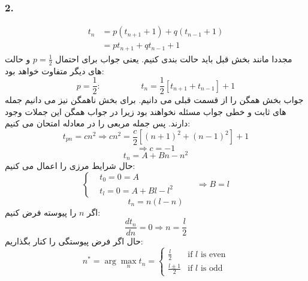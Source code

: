 \documentclass[]{article}
\begin{document}
	\subsubsection{2.}
	\begin{equation}
		\nonumber
		\begin{split}
			t_n &= p (t_{n+1} + 1) + q (t_{n-1}+1)\\
			&=pt_{n+1} + qt_{n-1} + 1
		\end{split}
	\end{equation}
	مجددا مانند بخش قبل باید حالت بندی کنیم. یعنی جواب برای احتمال $p=\frac{1}{2}$ و حالت های دیگر متفاوت خواهد بود:
	\begin{equation}
		\nonumber
		p = \frac{1}{2}: \hspace{2cm} t_n = \frac{1}{2} [t_{n+1}+t_{n-1}] + 1
	\end{equation}
	جواب بخش همگن را از قسمت قبلی می دانیم. برای بخش ناهمگن نیز می دانیم جمله های ثابت و خطی جواب مسئله نخواهند بود زیرا در جواب همگن این جملات وجود دارند. پس جمله مربعی را در معادله امتحان می کنیم:
	\begin{equation}
		\nonumber
		t_{pn} = cn^2 \Rightarrow cn^2 = \frac{c}{2} [(n+1)^2 + (n-1)^2] + 1
	\end{equation}
	\begin{equation}
		\nonumber
		\Rightarrow c = -1
	\end{equation}
	\begin{equation}
		\nonumber
		t_{n} = A+Bn -n^2 
	\end{equation}
	حال شرایط مرزی را اعمال می کنیم:
	\begin{equation}
		\nonumber
		\begin{cases}
			&t_0 = 0 = A\\
			&t_l = 0 = A+Bl - l^2
		\end{cases}
		\hspace{1cm}
		\Rightarrow B = l
	\end{equation}
	\begin{equation}
		\nonumber
		t_{n} = n(l-n)
	\end{equation}
	اگر $n$ را پیوسته فرض کنیم:
	\begin{equation}
		\nonumber
		\frac{dt_n}{dn} = 0 \Rightarrow n = \frac{l}{2}
	\end{equation}
	حال اگر فرض پیوستگی را کنار بگذاریم:
	\begin{equation}
		\nonumber
		n^* = \arg\max_n t_n = 
		\begin{cases}
			\frac{l}{2} &\mbox{if $l$ is even}\\
			\frac{l\pm1}{2}&\mbox{if $l$ is odd}
		\end{cases}
	\end{equation}
\end{document}
